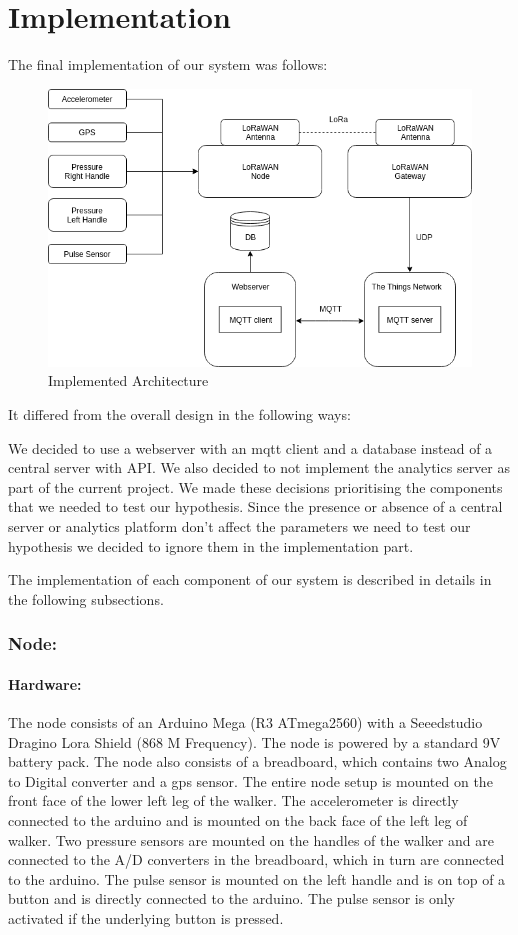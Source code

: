 \chapter{Implementation}
\label{cha:implementation}

The final implementation of our system was follows:
\begin{figure}[h]
\centering
\includegraphics[width=0.7\linewidth]{gfx/implementation_arch}
\caption[]{Implemented Architecture}
\label{fig:implementation_arch}
\end{figure}

It differed from the overall design in the following ways:

We decided to use a webserver with an mqtt client and a database instead of a central server with API. We also decided to not implement the analytics server as part of the current project. We made these decisions prioritising the components that we needed to test our hypothesis. Since the presence or absence of a central server or analytics platform don't affect the parameters we need to test our hypothesis we decided to ignore them in the implementation part.

The implementation of each component of our system is described in details in the following subsections.



\subsection{Node:} 

\subsubsection{Hardware:}
The node consists of an Arduino Mega (R3 ATmega2560) with a Seeedstudio Dragino Lora Shield (868 M Frequency). The node is powered by a standard 9V battery pack. The node also consists of a breadboard, which contains two Analog to Digital converter and a gps sensor. The entire node setup is mounted on the front face of the lower left leg of the walker. The accelerometer is directly connected to the arduino and is mounted on the back face of the left leg of walker. Two pressure sensors are mounted on the handles of the walker and are connected to the A/D converters in the breadboard, which in turn are connected to the arduino. The pulse sensor is mounted on the left handle and is on top of a button and is directly connected to the arduino. The pulse sensor is only activated if the underlying button is pressed. 


